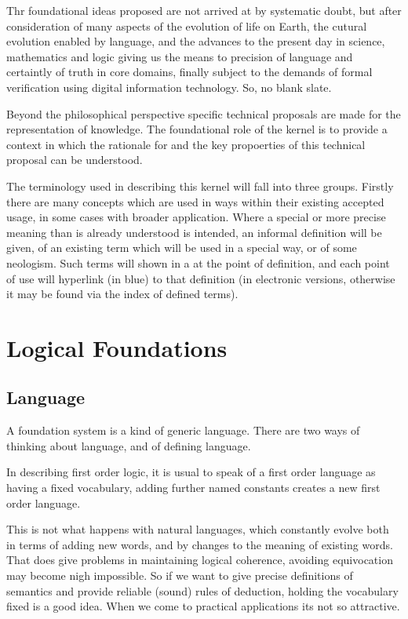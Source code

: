 Thr foundational ideas proposed are not arrived at by systematic doubt, but after consideration of many aspects of the evolution of life on Earth, the cutural evolution enabled by language, and the advances to the present day in science, mathematics and logic giving us the means to precision of language and certaintly of truth in core domains, finally subject to the demands of formal verification using digital information technology.
So, no blank slate.

Beyond the philosophical perspective specific technical proposals are made for the representation of knowledge.
The foundational role of the kernel is to provide a context in which the rationale for and the key propoerties of this technical proposal can be understood.

The terminology used in describing this kernel will fall into three 
groups.
Firstly there are many concepts which are used in ways within their existing accepted usage, in some cases with broader application.
Where a special or more precise meaning than is already understood   is intended, an informal definition will be given, of an existing term which will be used in a special way, or of some neologism.
Such terms will shown in a  at the point of definition, and each point of use will hyperlink (in blue) to that definition (in electronic versions, otherwise it may be found via the index of defined terms).



\section{Logical Foundations}

\subsection{Language}

A foundation system is a kind of generic language.
There are two ways of thinking about language, and of defining language.

In describing first order logic, it is usual to speak of a first order language as having a fixed vocabulary, adding further named constants creates a new first order language.

This is not what happens with natural languages, which constantly evolve both in terms of adding new words, and by changes to the meaning of existing words.
That does give problems in maintaining logical coherence, avoiding equivocation may become nigh impossible.
So if we want to give precise definitions of semantics and provide reliable (sound) rules of deduction, holding the vocabulary fixed is a good idea.
When we come to practical applications its not so attractive.

